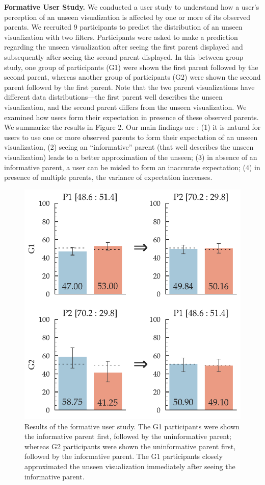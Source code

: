 \textbf{Formative User Study.} We conducted a user study to understand how a user's perception of an unseen visualization is affected by one or more of its observed parents. We recruited 9 participants to predict the distribution of an unseen visualization with two filters. Participants were asked to make a prediction regarding the unseen visualization after seeing the first parent displayed and subsequently after seeing the second parent displayed. In this between-group study, one group of participants (G1) were shown the first parent followed by the second parent, whereas another group of participants (G2) were shown the second parent followed by the first parent. Note that the two parent visualizations have different data distributions---the first parent well describes the unseen visualization, and the second parent differs from the unseen visualization. We examined how users form their expectation in presence of these observed parents. We summarize the results in Figure 2. Our main findings are : (1) it is natural for users to use one or more observed parents to form their expectation of an unseen visualization, (2) seeing an ``informative'' parent (that well describes the unseen visualization) leads to a better approximation of the unseen; (3) in absence of an informative parent, a user can be misled to form an inaccurate expectation; (4) in presence of multiple parents, the variance of expectation increases.
\begin{figure}[bht]
\label{example}
\centering
\includegraphics[scale=0.55]{figures/Formative_Study.pdf}
\caption{Results of the formative user study. The G1 participants were shown the informative parent first, followed by the uninformative parent; whereas G2 participants were shown the uninformative parent first, followed by the informative parent. The G1 participants closely approximated the unseen visualization immediately after seeing the informative parent.}
\end{figure}

